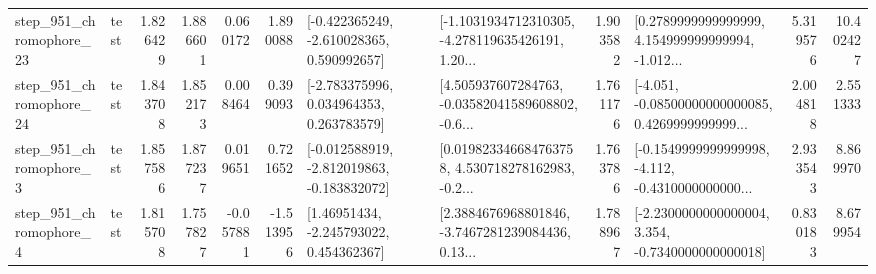 \begin{tabular}{llrrrrllrlrr}
  step\_951\_chromophore\_23 &      test &      1.826429 &    1.886601 &      0.060172 &  1.890088 &   [-0.422365249, -2.610028365, 0.590992657] &  [-1.1031934712310305, -4.278119635426191, 1.20... &       1.903582 &  [0.2789999999999999, 4.154999999999994, -1.012... &            5.319576 &         10.402427 \\
  step\_951\_chromophore\_24 &      test &      1.843708 &    1.852173 &      0.008464 &  0.399093 &    [-2.783375996, 0.034964353, 0.263783579] &  [4.505937607284763, -0.03582041589608802, -0.6... &       1.761176 &  [-4.051, -0.08500000000000085, 0.4269999999999... &            2.004818 &          2.551333 \\
   step\_951\_chromophore\_3 &      test &      1.857586 &    1.877237 &      0.019651 &  0.721652 &  [-0.012588919, -2.812019863, -0.183832072] &  [0.019823346684763758, 4.530718278162983, -0.2... &       1.763786 &  [-0.1549999999999998, -4.112, -0.4310000000000... &            2.933543 &          8.869970 \\
   step\_951\_chromophore\_4 &      test &      1.815708 &    1.757827 &     -0.057881 & -1.513956 &     [1.46951434, -2.245793022, 0.454362367] &  [2.3884676968801846, -3.7467281239084436, 0.13... &       1.788967 &  [-2.2300000000000004, 3.354, -0.7340000000000018] &            0.830183 &          8.679954 \\
\bottomrule
\end{tabular}

